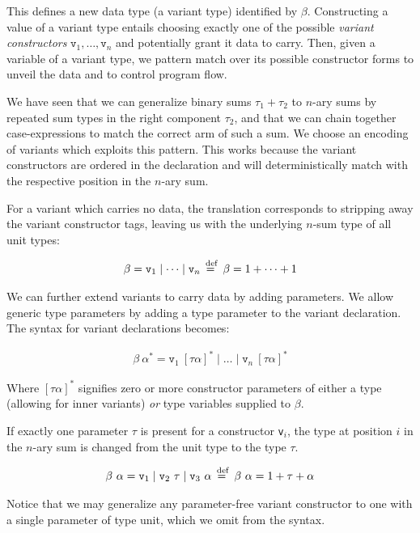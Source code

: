 This defines a new data type (a variant type) identified by $\beta$.
Constructing a value of a variant type entails choosing exactly one of the
possible \emph{variant constructors} $\texttt{v}_1, \dots, \texttt{v}_n$ and
potentially grant it data to carry. Then, given a variable of a variant type,
we pattern match over its possible constructor forms to unveil the data and to
control program flow.

We have seen that we can generalize binary sums $\tau_1 + \tau_2$ to $n$-ary
sums by repeated sum types in the right component $\tau_2$, and that we can
chain together case-expressions to match the correct arm of such a sum. We
choose an encoding of variants which exploits this pattern. This works because
the variant constructors are ordered in the declaration and will
deterministically match with the respective position in the $n$-ary sum.

For a variant which carries no data, the translation corresponds to stripping
away the variant constructor tags, leaving us with the underlying $n$-sum type
of all unit types:

\begin{align*}
  \beta = \texttt{v}_1 \mid \dots \mid \texttt{v}_n \stackrel{\>\text{def}}{=}\> \beta = 1 + \dots + 1
\end{align*}

We can further extend variants to carry data by adding parameters. We allow
generic type parameters by adding a type parameter to the variant declaration.
The syntax for variant declarations becomes:

\begin{align*}
  \beta~\alpha^* = \texttt{v}_1~[\tau\alpha]^* \mid \dots \mid \texttt{v}_n~[\tau\alpha]^*
\end{align*}

Where $[\tau\alpha]^*$ signifies zero or more constructor parameters of either
a type (allowing for inner variants) \emph{or} type variables supplied to
$\beta$.

If exactly one parameter $\tau$ is present for a constructor \texttt{v}$_i$, the
type at position $i$ in the $n$-ary sum is changed from the unit type to the
type $\tau$.

\begin{align*}
  \beta~\alpha = \texttt{v}_1 \mid \texttt{v}_2~\tau \mid \texttt{v}_3~\alpha
  \stackrel{\>\text{def}}{=}\> \beta~\alpha = 1 + \tau + \alpha
\end{align*}

Notice that we may generalize any parameter-free variant constructor to one
with a single parameter of type unit, which we omit from the syntax.

